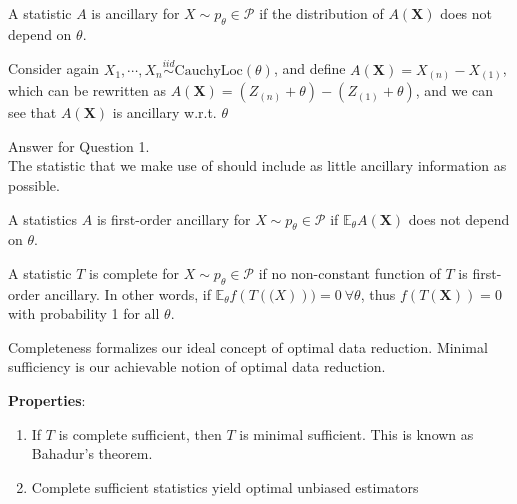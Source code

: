 \begin{definition}[Ancillarity]
    A statistic $A$ is ancillary for $X\sim p_\theta \in \mathcal{P}$
    if the distribution of $A(\boldsymbol{X})$ does not depend on $\theta$.
\end{definition}

\begin{example}
    Consider again $X_1,\cdots,X_n\overset{iid}{\sim}\text{CauchyLoc}(\theta)$,
    and define $A(\boldsymbol{X})=X_{(n)}-X_{(1)}$,
    which can be rewritten as $A(\boldsymbol{X})=(Z_{(n)}+\theta)-(Z_{(1)}+\theta)$,
    and we can see that $A(\boldsymbol{X})$ is ancillary w.r.t. $\theta$
\end{example}

\begin{solution} 
    Answer for Question 1.\\
    The statistic that we make use of should include as little ancillary information as possible.
\end{solution}

\begin{definition}
    A statistics $A$ is first-order ancillary for $X\sim p_\theta\in\mathcal{P}$
    if $\mathbb{E}_\theta A(\boldsymbol{X})$ does not depend on $\theta$.
\end{definition}

\begin{definition}[Completeness]
    A statistic $T$ is complete for $X\sim p_\theta\in\mathcal{P}$
    if no non-constant function of $T$ is first-order ancillary.
    In other words, if $\mathbb{E}_\theta{f(T(\boldsymbol(X)))}=0~\forall{\theta}$,
    thus $f(T(\boldsymbol{X}))=0$ with probability 1 for all $\theta$.
\end{definition}

Completeness formalizes our ideal concept of optimal data reduction.
Minimal sufficiency is our achievable notion of optimal data reduction.

\textbf{Properties}:
\begin{enumerate}
    \item If $T$ is complete sufficient, then $T$ is minimal sufficient. 
    This is known as Bahadur's theorem.
    \item Complete sufficient statistics yield optimal unbiased estimators
\end{enumerate}

